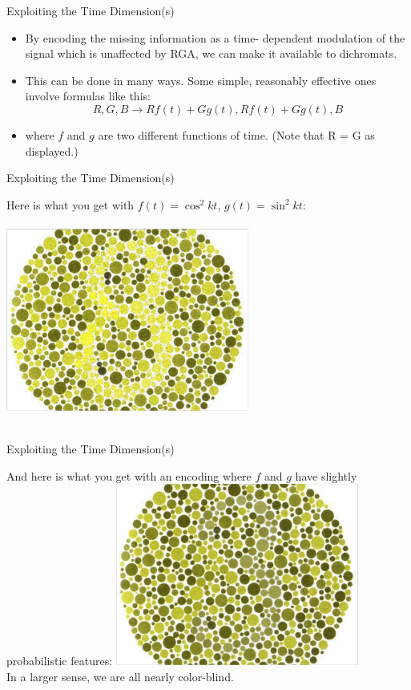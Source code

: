 \documentclass{beamer}
\begin{document}
\begin{frame}{Exploiting the Time Dimension(s)}
   \begin{itemize}
      \item By encoding the missing information as a time- dependent modulation of the signal which is unaffected by RGA, we can make it available to dichromats.
      \item This can be done in many ways. Some simple, reasonably effective ones involve formulas like this:
      \begin{equation*}
         {R,G,B} \rightarrow {Rf(t) + Gg(t), Rf(t)+Gg(t),B}
      \end{equation*}
      \item where $f$ and $g$ are two different functions of time. (Note that R = G as displayed.)
   \end{itemize}
\end{frame}

\begin{frame}{Exploiting the Time Dimension(s)}
   \begin{center}
      Here is what you get with $f(t)=\cos^2kt$, $g(t)=\sin^2kt$: \\~\\
      \includegraphics[width=0.6\textwidth]{figures/timefix.png}
      \\~\\
   \end{center}
\end{frame}

\begin{frame}{Exploiting the Time Dimension(s)}
   \begin{center}
      And here is what you get with an encoding where $f$ and $g$ have slightly probabilistic features:
      \includegraphics[width=0.6\textwidth]{figures/probfix.png}
      \\ In a larger sense, we are all nearly color-blind.
   \end{center}
\end{frame}
\end{document}
